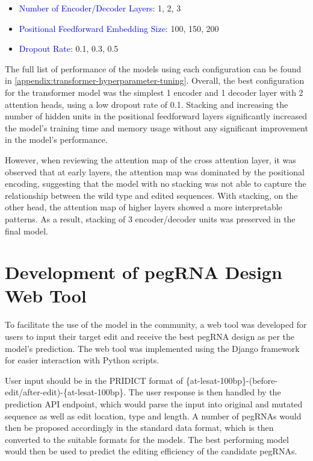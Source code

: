 \begin{itemize}[itemsep=-0mm]
    \item \textcolor{blue}{Number of Encoder/Decoder Layers}: 1, 2, 3
    \item \textcolor{blue}{Positional Feedforward Embedding Size}: 100, 150, 200
    \item \textcolor{blue}{Dropout Rate}: 0.1, 0.3, 0.5
\end{itemize}

The full list of performance of the models using each configuration can be found in \autoref{appendix:transformer-hyperparameter-tuning}. Overall, the best configuration for the transformer model was the simplest 1 encoder and 1 decoder layer with 2 attention heads, using a low dropout rate of 0.1. Stacking and increasing the number of hidden units in the positional feedforward layers significantly increased the model's training time and memory usage without any significant improvement in the model's performance. 

However, when reviewing the attention map of the cross attention layer, it was observed that at early layers, the attention map was dominated by the positional encoding, suggesting that the model with no stacking was not able to capture the relationship between the wild type and edited sequences. With stacking, on the other head, the attention map of higher layers showed a more interpretable patterns. As a result, stacking of 3 encoder/decoder units was preserved in the final model.

\section{Development of pegRNA Design Web Tool}

To facilitate the use of the model in the community, a web tool was developed for users to input their target edit and receive the best pegRNA design as per the model's prediction. The web tool was implemented using the Django framework for easier interaction with Python scripts. 

User input should be in the PRIDICT format of \{at-lesat-100bp\}-(before-edit/after-edit)-\{at-lesat-100bp\}. The user response is then handled by the prediction API endpoint, which would parse the input into original and mutated sequence as well as edit location, type and length. A number of pegRNAs would then be proposed accordingly in the standard data format, which is then converted to the suitable formats for the models. The best performing model would then be used to predict the editing efficiency of the candidate pegRNAs. 


